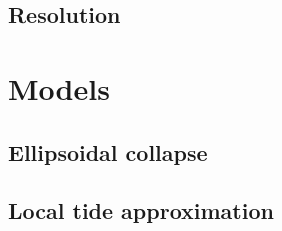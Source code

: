 \documentclass[a4paper,11pt]{article}
\begin{document}
\subsection{Resolution}
\label{app:250}



\section{Models}
\label{sec:models}


\subsection{Ellipsoidal collapse}
\label{sub:ellip}

\subsection{Local tide approximation}
\label{sub:lta}






\end{document}
